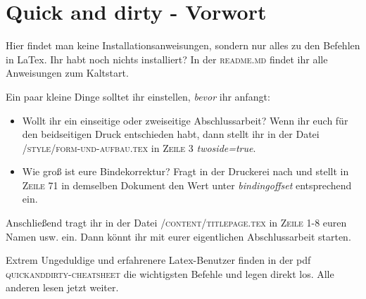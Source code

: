 \chapter{Quick and dirty - Vorwort}%
\label{chap: vorwort}%
Hier findet man keine Installationsanweisungen, sondern nur alles zu den Befehlen in LaTex. Ihr habt noch nichts installiert? In der \textsc{readme.md} findet ihr alle Anweisungen zum Kaltstart.%


Ein paar kleine Dinge solltet ihr einstellen, \emph{bevor} ihr anfangt:%
\begin{itemize}%
\item Wollt ihr ein einseitige oder zweiseitige Abschlussarbeit? Wenn ihr euch für den beidseitigen Druck entschieden habt, dann stellt ihr in der Datei \textsc{/style/form-und-aufbau.tex} in \textsc{Zeile 3} \emph{twoside=true}.%
\item Wie groß ist eure Bindekorrektur? Fragt in der Druckerei nach und stellt in \textsc{Zeile 71} in demselben Dokument den Wert unter \emph{bindingoffset} entsprechend ein.%
\end{itemize}%
Anschließend tragt ihr in der Datei \textsc{/content/titlepage.tex} in \textsc{Zeile 1-8} euren Namen usw. ein. Dann könnt ihr mit eurer eigentlichen Abschlussarbeit starten.%

Extrem Ungeduldige und erfahrenere Latex-Benutzer finden in der pdf \textsc{quickanddirty-cheatsheet} die wichtigsten Befehle und legen direkt los. Alle anderen lesen jetzt weiter.%
\newpage
